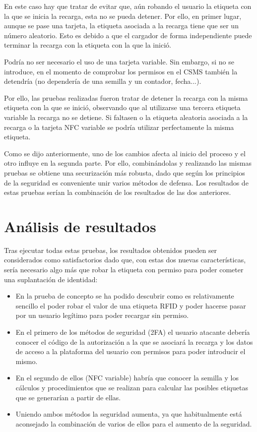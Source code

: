 \documentclass[12pt,a4paper,onecolumn,oneside]{report}
\newcounter{subsubsubsection}[subsubsection]
\begin{document}
En este caso hay que tratar de evitar que, aún robando el usuario la etiqueta con la que se inicia la recarga, esta no se pueda detener. Por ello, en primer lugar, aunque se pase una tarjeta, la etiqueta asociada a la recarga tiene que ser un número aleatorio. Esto es debido a que el cargador de forma independiente puede terminar la recarga con la etiqueta con la que la inició.

Podría no ser necesario el uso de una tarjeta variable. Sin embargo, si no se introduce, en el momento de comprobar los permisos en el CSMS también la detendría (no dependería de una semilla y un contador, fecha...).

Por ello, las pruebas realizadas fueron tratar de detener la recarga con la misma etiqueta con la que se inició, observando que al utilizarse una tercera etiqueta variable la recarga no se detiene. Si faltasen o la etiqueta aleatoria asociada a la recarga o la tarjeta NFC variable se podría utilizar perfectamente la misma etiqueta.



Como se dijo anteriormente, uno de los cambios afecta al inicio del proceso y el otro influye en la segunda parte. Por ello, combinándolas y realizando las mismas pruebas se obtiene una securización más robusta, dado que según los principios de la seguridad es conveniente unir varios métodos de defensa. Los resultados de estas pruebas serían la combinación de los resultados de las dos anteriores.

\section{Análisis de resultados}

Tras ejecutar todas estas pruebas, los resultados obtenidos pueden ser considerados como satisfactorios dado que, con estas dos nuevas características, sería necesario algo más que robar la etiqueta con permiso para poder cometer una suplantación de identidad:

\begin{itemize}
\item En la prueba de concepto se ha podido descubrir como es relativamente sencillo el poder robar el valor de una etiqueta RFID y poder hacerse pasar por un usuario legítimo para poder recargar sin permiso.
\item En el primero de los métodos de seguridad (2FA) el usuario atacante debería conocer el código de la autorización a la que se asociará la recarga y los datos de acceso a la plataforma del usuario con permisos para poder introducir el mismo.
\item En el segundo de ellos (NFC variable) habría que conocer la semilla y los cálculos y procedimientos que se realizan para calcular las posibles etiquetas que se generarían a partir de ellas.
\item Uniendo ambos métodos la seguridad aumenta, ya que habitualmente está aconsejado la combinación de varios de ellos para el aumento de la seguridad.
\end{itemize}
\end{document}

